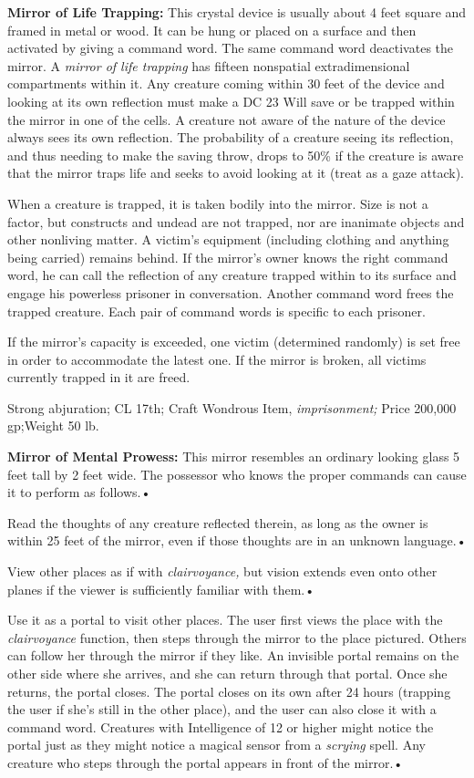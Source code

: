 \documentclass{article}
\begin{document}
\textbf{Mirror of Life Trapping:} This crystal device is usually about 4 feet square 
and framed in metal or wood. It can be hung or placed on a surface and then activated 
by giving a command word. The same command word deactivates the mirror. A \textit{mirror 
of life trapping }has fifteen nonspatial extradimensional compartments within it. 
Any creature coming within 30 feet of the device and looking at its own reflection 
must make a DC 23 Will save or be trapped within the mirror in one of the cells. 
A creature not aware of the nature of the device always sees its own reflection. 
The probability of a creature seeing its reflection, and thus needing to make the 
saving throw, drops to 50\% if the creature is aware that the mirror traps life 
and seeks to avoid looking at it (treat as a gaze attack).

When a creature is trapped, it is taken bodily into the mirror. Size is not a factor, 
but constructs and undead are not trapped, nor are inanimate objects and other 
nonliving matter. A victim's equipment (including clothing and anything being carried) 
remains behind. If the mirror's owner knows the right command word, he can call 
the reflection of any creature trapped within to its surface and engage his powerless 
prisoner in conversation. Another command word frees the trapped creature. Each 
pair of command words is specific to each prisoner.

If the mirror's capacity is exceeded, one victim (determined randomly) is set free 
in order to accommodate the latest one. If the mirror is broken, all victims currently 
trapped in it are freed.

Strong abjuration; CL 17th; Craft Wondrous Item, \textit{imprisonment; }Price 200,000 
gp;Weight 50 lb.

\textbf{Mirror of Mental Prowess:} This mirror resembles an ordinary looking glass 
5 feet tall by 2 feet wide. The possessor who knows the proper commands can cause 
it to perform as follows.• 

\parindent=3pt
Read the thoughts of any creature reflected therein, as long as the owner is within 
25 feet of the mirror, even if those thoughts are in an unknown language.• 

View other places as if with \textit{clairvoyance, }but vision extends even onto 
other planes if the viewer is sufficiently familiar with them.• 

Use it as a portal to visit other places. The user first views the place with the 
\textit{clairvoyance }function, then steps through the mirror to the place pictured. 
Others can follow her through the mirror if they like. An invisible portal remains 
on the other side where she arrives, and she can return through that portal. Once 
she returns, the portal closes. The portal closes on its own after 24 hours (trapping 
the user if she's still in the other place), and the user can also close it with 
a command word. Creatures with Intelligence of 12 or higher might notice the portal 
just as they might notice a magical sensor from a \textit{scrying }spell. Any creature 
who steps through the portal appears in front of the mirror.• 
\end{document}
